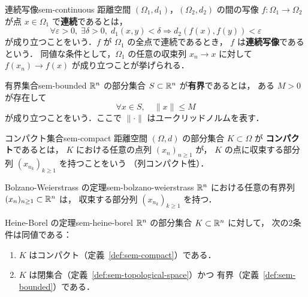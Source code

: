\begin{definition}{連続写像}{sem-continuous}
  距離空間 $(\Omega_1, d_1)$，$(\Omega_2, d_2)$ の間の写像
  $f \colon \Omega_1 \to \Omega_2$ が点 $x \in \Omega_1$ で\textbf{連続}であるとは，
  \[
    \forall \varepsilon > 0,\; \exists \delta > 0,\;
    d_1(x, y) < \delta \Longrightarrow d_2(f(x), f(y)) < \varepsilon
  \]
  が成り立つことをいう．$f$ が $\Omega_1$ の全点で連続であるとき，
  $f$ は\textbf{連続写像}であるという．
  同値な条件として，$\Omega_1$ の任意の収束列 $x_n \to x$ に対して
  $f(x_n) \to f(x)$ が成り立つことが挙げられる．
\end{definition}

\begin{definition}{有界集合}{sem-bounded}
  $\mathbb{R}^n$ の部分集合 $S \subset \mathbb{R}^n$ が\textbf{有界}であるとは，
  ある $M > 0$ が存在して
  \[
    \forall x \in S,\quad \|x\| \leq M
  \]
  が成り立つことをいう．ここで $\|\cdot\|$ はユークリッドノルムを表す．
\end{definition}

\begin{definition}{コンパクト集合}{sem-compact}
  距離空間 $(\Omega, d)$ の部分集合 $K \subset \Omega$ が
  \textbf{コンパクト}であるとは，
  $K$ における任意の点列 $(x_n)_{n \geq 1}$ が，
  $K$ の点に収束する部分列 $(x_{n_k})_{k \geq 1}$ を持つことをいう
  （列コンパクト性）．
\end{definition}

\begin{claim}{Bolzano-Weierstrass の定理}{sem-bolzano-weierstrass}
  $\mathbb{R}^n$ における任意の有界列 $(x_n)_{n \geq 1} \subset \mathbb{R}^n$ は，
  収束する部分列 $(x_{n_k})_{k \geq 1}$ を持つ．
\end{claim}

\begin{theorem}{Heine-Borel の定理}{sem-heine-borel}
  $\mathbb{R}^n$ の部分集合 $K \subset \mathbb{R}^n$ に対して，
  次の2条件は同値である：
  \begin{enumerate}
    \item[(i)] $K$ はコンパクト（定義~\ref{def:sem-compact}）である．
    \item[(ii)] $K$ は閉集合（定義~\ref{def:sem-topological-space}）かつ
      有界（定義~\ref{def:sem-bounded}）である．
  \end{enumerate}
\end{theorem}

